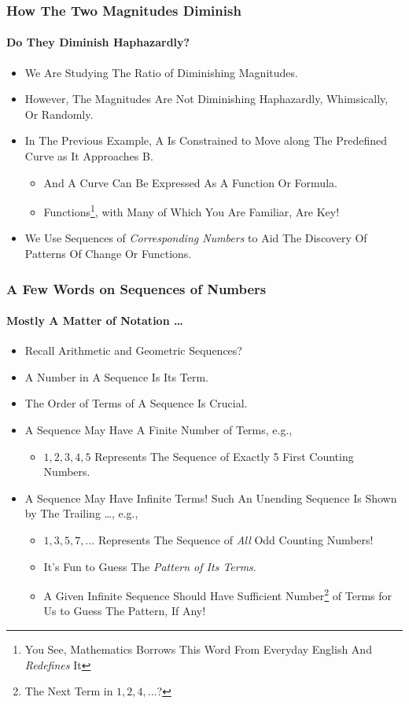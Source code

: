 \documentclass{beamer}
\begin{document}
\begin{frame}
\frametitle{How The Two Magnitudes Diminish}
\framesubtitle{Do They Diminish Haphazardly?}
\label{slide:mannerofchange}
\begin{itemize}
\pause
\item We Are Studying The Ratio of Diminishing Magnitudes.
\pause
\item However, The Magnitudes Are \alert{Not Diminishing Haphazardly, Whimsically, Or Randomly}.
\pause
\item In The Previous Example, \alert{A Is Constrained to Move along The Predefined Curve as It Approaches B}. 
\begin{itemize}
\item And A Curve Can Be Expressed As A Function Or Formula.
\item \alert{Functions\footnote{You See, Mathematics Borrows This Word From Everyday English And \textit{Redefines} It}}, with Many of Which You Are Familiar, Are Key!  
\end{itemize}
\pause
\item We Use \alert{Sequences of \textit{Corresponding Numbers}} to Aid The Discovery Of Patterns Of Change Or Functions.
\end{itemize}
\end{frame}
\begin{frame}
\frametitle{A Few Words on Sequences of Numbers}
\framesubtitle{Mostly A Matter of Notation \dots}
\label{slide:onseq}
\begin{itemize}
\pause
\item Recall \alert{Arithmetic and Geometric Sequences}?
\pause
\item A Number in A Sequence Is Its \alert{Term}.
\pause
\item The \alert{Order} of Terms of A Sequence Is Crucial.
\pause
\item A Sequence May Have A Finite Number of Terms, e.g.,
\begin{itemize}
\item $1,2,3,4,5$ Represents The Sequence of \alert{Exactly 5 First Counting Numbers}.
\end{itemize}
\pause
\item A Sequence May Have Infinite Terms! Such An \alert{Unending Sequence} Is Shown by The Trailing \dots, e.g.,
\begin{itemize}
\item $1,3,5,7,\dots$ Represents The Sequence of \textit{All} Odd Counting Numbers!
\pause
\item It's Fun to \alert{Guess} The \textit{Pattern of Its Terms}.
\pause
\item A Given Infinite Sequence Should Have Sufficient Number\footnote{The Next Term in $1,2,4,\dots$?} of Terms for Us to Guess The Pattern, If Any!
\end{itemize}
\end{itemize}
\end{frame}
\end{document}
